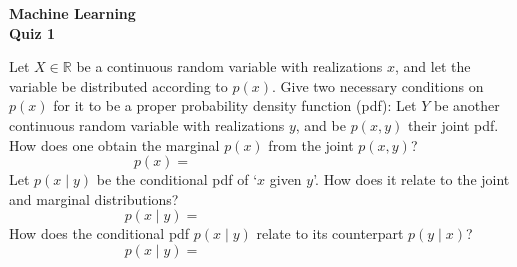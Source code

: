 \documentclass[11pt,noanswers,addpoints]{exam}
\newcommand{\R}{\mathbb R}
\begin{document}
{\Large{\textbf{Machine Learning}}} \\[2mm]
\textbf{\Huge{Quiz 1}}\\


\hfill\hfill{}


\begin{questions}
\question[1] Let $X\in\R$ be a continuous random variable with realizations $x$, and let the variable be distributed according to $p(x)$. Give two necessary conditions on $p(x)$ for it to be a proper probability density function (pdf):\vspace{1.5cm}\bigskip
\question[1]  Let $Y$ be another continuous random variable with realizations $y$, and be $p(x,y)$ their joint pdf. How does one obtain the marginal $p(x)$ from the joint $p(x,y)$? $$p(x) = \qquad\qquad\qquad\qquad\qquad\qquad\qquad$$\bigskip
\question[1] Let $p(x\mid y)$ be the conditional pdf of `$x$ given $y$'. How does it relate to the joint and marginal distributions? $$p(x\mid y) = \qquad\qquad\qquad\qquad\qquad\qquad\qquad$$\bigskip
\question[1] How does the conditional pdf $p(x\mid y)$ relate to its counterpart $p(y\mid x)$?$$ p(x\mid y) =\qquad\qquad\qquad\qquad\qquad\qquad\qquad$$

\end{questions}
\end{document}
